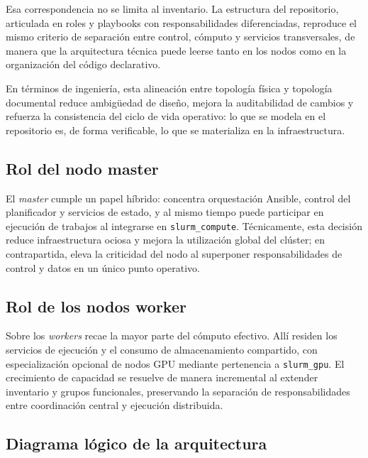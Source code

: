 Esa correspondencia no se limita al inventario. La estructura del repositorio, articulada en roles y playbooks con responsabilidades diferenciadas, reproduce el mismo criterio de separación entre control, cómputo y servicios transversales, de manera que la arquitectura técnica puede leerse tanto en los nodos como en la organización del código declarativo.

En términos de ingeniería, esta alineación entre topología física y topología documental reduce ambigüedad de diseño, mejora la auditabilidad de cambios y refuerza la consistencia del ciclo de vida operativo: lo que se modela en el repositorio es, de forma verificable, lo que se materializa en la infraestructura.

\subsection{Rol del nodo master}
\label{subsec:arq_master}

El \textit{master} cumple un papel híbrido: concentra orquestación Ansible, control del planificador y servicios de estado, y al mismo tiempo puede participar en ejecución de trabajos al integrarse en \texttt{slurm\_compute}. Técnicamente, esta decisión reduce infraestructura ociosa y mejora la utilización global del clúster; en contrapartida, eleva la criticidad del nodo al superponer responsabilidades de control y datos en un único punto operativo.

\subsection{Rol de los nodos worker}
\label{subsec:arq_workers}

Sobre los \textit{workers} recae la mayor parte del cómputo efectivo. Allí residen los servicios de ejecución y el consumo de almacenamiento compartido, con especialización opcional de nodos GPU mediante pertenencia a \texttt{slurm\_gpu}. El crecimiento de capacidad se resuelve de manera incremental al extender inventario y grupos funcionales, preservando la separación de responsabilidades entre coordinación central y ejecución distribuida.

\subsection{Diagrama lógico de la arquitectura}
\label{subsec:arq_diagrama}

